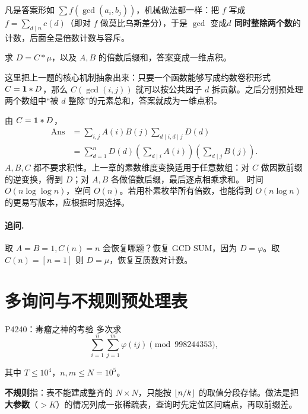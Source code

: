 \begin{tip}
凡是答案形如 $\sum f(\gcd(a_i,b_j))$，机械做法都一样：把 $f$ 写成 $f=\sum_{d\mid n}c(d)$（即对 $f$ 做莫比乌斯差分），于是 $\gcd$ 变成\textbf{$d$ 同时整除两个数}的计数，后面全是倍数计数与容斥。
\end{tip}

\hint 求 $D=C*\mu$，以及 $A,B$ 的倍数后缀和，答案变成一维点积。

\begin{pitfall}[讲解：先看这题到底在做什么]
这里把上一题的核心机制抽象出来：只要一个函数能够写成约数卷积形式 $C=\mathbf 1*D$，那么 $C(\gcd(i,j))$ 就可以按公共因子 $d$ 拆贡献。之后分别预处理两个数组中“被 $d$ 整除”的元素总和，答案就成为一维点积。
\end{pitfall}

\sol 由 $C=\mathbf 1*D$，
\[
\begin{aligned}
\mathrm{Ans}
&=\sum_{i,j}A(i)B(j)\sum_{d\mid i,d\mid j}D(d)\\
&=\sum_{d=1}^nD(d)
 \left(\sum_{d\mid i}A(i)\right)
 \left(\sum_{d\mid j}B(j)\right).
\end{aligned}
\]
$A,B,C$ 都不要求积性。上一章的素数维度变换适用于任意数组：对 $C$ 做因数前缀的逆变换，得到 $D$；对 $A,B$ 各做倍数后缀，最后逐点相乘求和。
\cost 时间 $O(n\log\log n)$，空间 $O(n)$。若用朴素枚举所有倍数，也能得到 $O(n\log n)$ 的更易写版本，应根据时限选择。
\paragraph{追问.} 取 $A=B=1,C(n)=n$ 会恢复哪题？恢复 GCD SUM，因为 $D=\varphi$。取 $C(n)=[n=1]$ 则 $D=\mu$，恢复互质数对计数。


\section{多询问与不规则预处理表}
\begin{problem}{P4240：毒瘤之神的考验}
多次求
\[
 \sum_{i=1}^n\sum_{j=1}^m\varphi(ij)\pmod{998244353},
\]


其中 $T\le10^4$，$n,m\le N=10^5$。
\end{problem}

\begin{tip}[词义：不规则的预处理表]
\textbf{不规则}指：表不能建成整齐的 $N\times N$，只能按 $\left\lfloor n/k\right\rfloor$ 的取值分段存储。做法是把\textbf{大参数}（$>K$）的情况列成一张稀疏表，查询时先定位区间端点，再取前缀差。
\end{tip}

